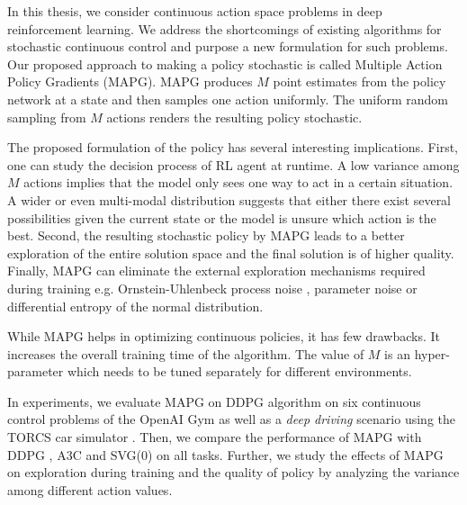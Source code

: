 In this thesis, we consider continuous action space problems in deep reinforcement learning. We address the shortcomings of existing algorithms for stochastic continuous control and purpose a new formulation for such problems. Our proposed approach to making a policy stochastic is called Multiple Action Policy Gradients (MAPG). MAPG produces $M$ point estimates from the policy network at a state and then samples one action uniformly. The uniform random sampling from $M$ actions renders the resulting policy stochastic. 

The proposed formulation of the policy has several interesting implications. First, one can study the decision process of RL agent at runtime. A low variance among $M$ actions implies that the model only sees one way to act in a certain situation. A wider or even multi-modal distribution suggests that either there exist several possibilities given the current state or the model is unsure which action is the best. Second, the resulting stochastic policy by MAPG leads to a better exploration of the entire solution space and the final solution is of higher quality. Finally, MAPG can eliminate the external exploration mechanisms required during training e.g. Ornstein-Uhlenbeck process noise \cite{ounoise}, parameter noise \cite{paramnoise} or differential entropy of the normal distribution.

While MAPG helps in optimizing continuous policies, it has few drawbacks. It increases the overall training time of the algorithm. The value of $M$ is an hyper-parameter which needs to be tuned separately for different environments. 

In experiments, we evaluate MAPG on DDPG \cite{ddpg} algorithm on six continuous control problems of the OpenAI Gym \cite{greg2016} as well as a \textit{deep driving} scenario using the TORCS car simulator \cite{TORCS}. Then, we compare the performance of MAPG with DDPG \cite{ddpg}, A3C \cite{a3c} and SVG(0) \cite{svg} on all tasks. Further, we study the effects of MAPG on exploration during training and the quality of policy by analyzing the variance among different action values.
